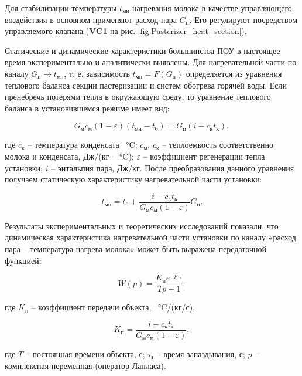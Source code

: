Для стабилизации температуры $t_\text{мн}$ нагревания молока в качестве управляющего воздействия в основном применяют расход пара $G_\text{п}$. Его регулируют посредством управляемого клапана (\textbf{VC1} на рис. \ref{fig:Pasterizer_heat_section}).

Статические и динамические характеристики большинства ПОУ в настоящее время экспериментально и аналитически выявлены. Для нагревательной части по каналу $G_\text{п} \rightarrow t_\text{мн}$, т. е. зависимость $t_\text{мн}=F(G_\text{п})$ определяется из уравнения теплового баланса секции пастеризации и систем обогрева горячей воды. Если пренебречь потерями тепла в окружающую среду, то уравнение теплового баланса в установившемся режиме имеет вид:

\begin{equation}
    G_\text{м} c_\text{м}(1 - \varepsilon)(t_\text{мн} - t_0) = G_\text{п}(i - c_\text{к} t_\text{к}),
\end{equation}

где $c_\text{к}$ – температура конденсата \SI{}{\celsius}; $c_\text{м}$, $c_\text{к}$ – теплоемкость соответственно молока и конденсата, Дж/(кг·\SI{}{\celsius}); $\varepsilon$ – коэффициент регенерации тепла установки; $i$ – энтальпия пара, Дж/кг. После преобразования данного уравнения получаем статическую характеристику нагревательной части установки:

\begin{equation}
    t_\text{мн} = t_0 + \frac{i - c_\text{к} t_\text{к}}{G_\text{м} c_\text{м}(1 - \varepsilon)} G_\text{п}.
\end{equation}

Результаты экспериментальных и теоретических исследований показали, что динамическая характеристика нагревательной части установки по каналу «расход пара – температура нагрева молока» может быть выражена передаточной функцией:

\begin{equation}\label{steam_temp_relation}
    W(p) = \frac{K_\text{п} e^{-p \tau_\text{з}}} {Tp + 1},
\end{equation}

где $K_\text{п}$ – коэффициент передачи объекта, \SI{}{\celsius}/(кг/с),

\begin{equation}
    K_\text{п} = \frac{i - c_\text{к} t_\text{к}}{G_\text{м} c_\text{м}(1 - \varepsilon)},
\end{equation}

где $T$ – постоянная времени объекта, с; $\tau_\text{з}$ – время запаздывания, с; $p$ – комплексная переменная (оператор Лапласа).

